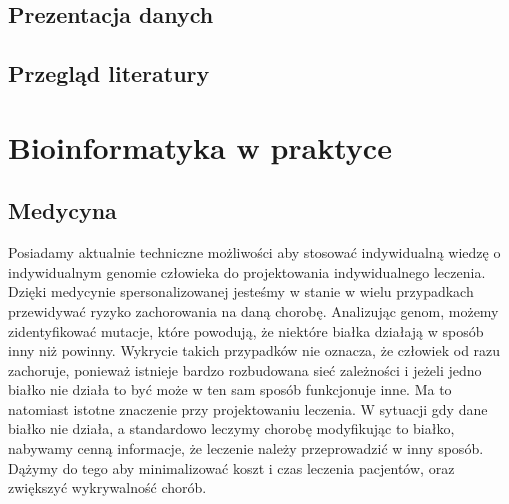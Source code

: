 \section{Prezentacja danych}

\section{Przegląd literatury}

\chapter{Bioinformatyka w praktyce}

\section{Medycyna}
Posiadamy aktualnie techniczne możliwości aby stosować indywidualną wiedzę o indywidualnym genomie człowieka do projektowania indywidualnego leczenia. Dzięki medycynie spersonalizowanej jesteśmy w stanie w wielu przypadkach przewidywać ryzyko zachorowania na daną chorobę. Analizując genom, możemy zidentyfikować mutacje, które powodują, że niektóre białka działają w sposób inny niż powinny. Wykrycie takich przypadków nie oznacza, że człowiek od razu zachoruje, ponieważ istnieje bardzo rozbudowana sieć zależności i jeżeli jedno białko nie działa to być może w ten sam sposób funkcjonuje inne. Ma to natomiast istotne znaczenie przy projektowaniu leczenia. W sytuacji gdy dane białko nie działa, a standardowo leczymy chorobę modyfikując to białko, nabywamy cenną informacje, że leczenie należy przeprowadzić w inny sposób. Dążymy do tego aby minimalizować koszt i czas leczenia pacjentów, oraz zwiększyć wykrywalność chorób.



